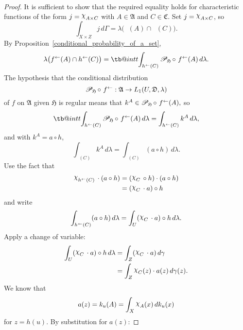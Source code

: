 \documentclass[
twoside=true,
paper=letter,
fontsize=9pt,
pagesize=auto,
leqno,
openany,
headsepline,
overfullrule,
]{scrbook}
\makeatletter
\theoremstyle{plain}
\theoremstyle{plain}
\theoremstyle{definition}
\theoremstyle{bfnoteitalic}
\theoremstyle{bfnoteroman}
\newcommand{\sigalg}[1]{\mathfrak{#1}}
\newcommand{\cali}[1]{\mathscr{#1}}
\newcommand{\condprobop}[1]{\mathop{\cali{P}\hspace{-1pt}}\nolimits_{#1}}
\newcommand{\charfunction}[1]{\mathop{{\raisebox{2pt}{$\chi$}}_{#1}}}
\newcommand{\preimage}[1]{\mathop{#1^{\leftarrow}}}
\newcommand{\meets}{\cap}
\newcommand{\sigmaalgebra}{\sigalg{A}}
\newcommand{\sigmaalgebraiii}{\sigalg{C}}
\newcommand{\funcf}{f}
\newcommand{\funch}{h}
\newcommand{\funcj}{j}
\newcommand{\funck}{k}
\newcommand{\function}{f}
\newcommand{\measurespace}{X}
\newcommand{\measurespaceiii}{Z}
\newcommand{\mspaceelt}{x}
\newcommand{\mspaceeltiii}{z}
\newcommand{\measureiii}{\lambda}
\newcommand{\measlambda}{\lambda}
\newcommand{\seti}{A}
\newcommand{\setiii}{C}
\newcommand{\uspace}{U}%
\newcommand{\uspaceelt}{u}
\newcommand{\uspacesig}{\sigalg{D}}
\newcommand{\measonprod}{\Gamma}%
\newcommand{\marginalthree}{\gamma}
\newcommand\tint{\mathop{\mathpalette\tb@int{t}}\!\int}
\newcommand\tb@int[2]{%
  \sbox\z@{$\m@th#1\int$}%
  \if#2t%
    \rlap{\hbox to\wd\z@{%
      \hfil
      \vrule width .35em height \dimexpr\ht\z@+1.4pt\relax depth -\dimexpr\ht\z@+1pt\relax
      \kern.05em %
    }}
  \else
    \rlap{\hbox to\wd\z@{%
      \vrule width .35em height -\dimexpr\dp\z@+1pt\relax depth \dimexpr\dp\z@+1.4pt\relax
      \hfil
    }}
  \fi
}
\newcommand{\inducedint}{\tint}
\makeatother
\begin{document}
\begin{proof}
It is sufficient to show that the required equality holds for characteristic functions of the form
$\funcj
=
\charfunction{\seti\times\setiii}$
with
$\seti\in\sigmaalgebra$
and
$\setiii\in\sigmaalgebraiii$.
Set
$\funcj
=
\charfunction{\seti\times\setiii}$,
so
\[
\int_{\measurespace\times\measurespaceiii}
\funcj
\, d\measonprod
=
\measlambda\bigl(\preimage{\funcf}(\seti)\meets \preimage{\funch}(\setiii)\bigr).
\]
By Proposition~\ref{conditional_probability_of_a_set},
\[
\measlambda\bigl(\preimage{\funcf}(\seti)\meets \preimage{\funch}(\setiii)\bigr)
=
\inducedint_{\preimage{\funch}(\setiii)}
\condprobop{\sigalg{H}}\circ\, \preimage{\function}(\seti)
\, d\measlambda.
\]
The hypothesis that the conditional distribution
\[
\condprobop{\sigalg{H}}\circ\, \preimage{\function}:
\sigmaalgebra \to L_1(\uspace,\uspacesig,\measureiii)
\]
of $\function$ on $\sigmaalgebra$ given $\sigalg{H}$
is regular means that
$\funck^\seti
\in
\condprobop{\sigalg{H}}\circ\, \preimage{\function}(\seti),$
so
\[
\inducedint_{\preimage{\funch}(\setiii)}
\condprobop{\sigalg{H}}\circ\, \preimage{\function}(\seti)
\, d\measlambda
=
\int_{\preimage{\funch}(\setiii)}
\funck^\seti \, d\measlambda,
\]
and with $\funck^\seti = a\circ \funch$,
\[
\int_{\preimage{\funch}(\setiii)}
\funck^\seti \, d\measlambda
=
\int_{\preimage{\funch}(\setiii)}
( a\circ\funch ) \, d\measlambda.
\]
Use the fact that
\begin{align*}
\charfunction{\preimage{\funch}(\setiii)}{}\cdot{}(a\circ\funch)
& =
(\charfunction{\setiii}{}\circ{} \funch)\cdot(a\circ\funch) \\
& =
(\charfunction{\setiii}{}\cdot{} a)\circ \funch \\
\end{align*}
and write
\[
\int_{\preimage{\funch}(\setiii)}
( a\circ\funch ) \, d\measlambda
=
\int_\uspace
(\charfunction{\setiii}{}\cdot{} a)\circ \funch
\, d\measlambda.
\]
Apply a change of variable:
\begin{align*}
\int_\uspace
(\charfunction{\setiii}{}\cdot{} a)\circ \funch
\, d\measlambda
& =
\int_\measurespaceiii
(\charfunction{\setiii}{}\cdot{} a)\, d\marginalthree \\
& =
\int_\measurespaceiii
\charfunction{\setiii}(\mspaceeltiii)
\cdot
a(\mspaceeltiii)\, d\marginalthree(\mspaceeltiii).
\end{align*}
We know that
\[
a(\mspaceeltiii)
=
\funck_\uspaceelt(\seti)
=
\int_\measurespace
\charfunction{\seti} (\mspaceelt)
\, d\funck_\uspaceelt (\mspaceelt)
\]
for $\mspaceeltiii = \funch(\uspaceelt)$.
By substitution for $a(\mspaceeltiii)$:

\end{proof}
\end{document}
